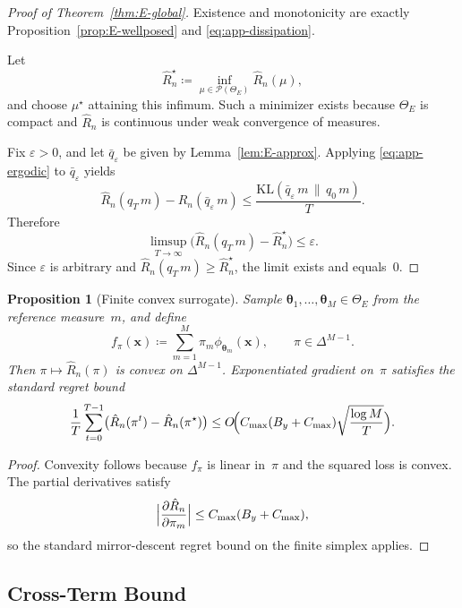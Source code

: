 \documentclass[11pt,a4paper]{article}
\newtheorem{proposition}[theorem]{Proposition}
\theoremstyle{definition}
\theoremstyle{remark}
\newcommand{\vtheta}{\boldsymbol{\theta}}
\newcommand{\vx}{\mathbf{x}}
\begin{document}
\begin{proof}[Proof of Theorem~\ref{thm:E-global}]
  Existence and monotonicity are exactly
  Proposition~\ref{prop:E-wellposed} and
  \eqref{eq:app-dissipation}.

  Let
  \[
    \hat R_n^\star
    \coloneqq
    \inf_{\mu \in \mathcal{P}(\Theta_E)}
    \hat R_n(\mu),
  \]
  and choose \(\mu^\star\) attaining this
  infimum. Such a minimizer exists because
  \(\Theta_E\) is compact and
  \(\hat R_n\) is continuous under weak
  convergence of measures.

  Fix \(\varepsilon>0\), and let
  \(\bar q_\varepsilon\) be given by
  Lemma~\ref{lem:E-approx}. Applying
  \eqref{eq:app-ergodic} to \(\bar q_\varepsilon\)
  yields
  \[
    \hat R_n(q_T\,m)
    -
    \hat R_n(\bar q_\varepsilon\,m)
    \le
    \frac{
      \mathrm{KL}(\bar q_\varepsilon\,m \,\|\, q_0\,m)
    }{T}.
  \]
  Therefore
  \[
    \limsup_{T\to\infty}
    \bigl(
      \hat R_n(q_T\,m) - \hat R_n^\star
    \bigr)
    \le \varepsilon.
  \]
  Since \(\varepsilon\) is arbitrary and
  \(\hat R_n(q_T\,m)\ge \hat R_n^\star\), the
  limit exists and equals~\(0\).
\end{proof}

\begin{proposition}[Finite convex surrogate]
  \label{prop:E-eg}
  Sample
  \(\vtheta_1,\dots,\vtheta_M \in \Theta_E\)
  from the reference measure~\(m\), and define
  \[
    f_\pi(\vx)
    \coloneqq
    \sum_{m=1}^M \pi_m \phi_{\vtheta_m}(\vx),
    \qquad
    \pi \in \Delta^{M-1}.
  \]
  Then
  \(
    \pi \mapsto \hat R_n(\pi)
  \)
  is convex on \(\Delta^{M-1}\).
  Exponentiated gradient on~\(\pi\) satisfies
  the standard regret bound
  \[
    \frac{1}{T}
    \sum_{t=0}^{T-1}
    \bigl(
      \hat R_n(\pi^t)-\hat R_n(\pi^\star)
    \bigr)
    \le
    O\!\Bigl(
      C_{\max}(B_y+C_{\max})
      \sqrt{\frac{\log M}{T}}
    \Bigr).
  \]
\end{proposition}

\begin{proof}
  Convexity follows because \(f_\pi\) is linear
  in~\(\pi\) and the squared loss is convex.
  The partial derivatives satisfy
  \[
    \Bigl|
    \frac{\partial \hat R_n}{\partial \pi_m}
    \Bigr|
    \le C_{\max}(B_y+C_{\max}),
  \]
  so the standard mirror-descent regret bound on
  the finite simplex applies.
\end{proof}

\subsection{Cross-Term Bound}
\end{document}
